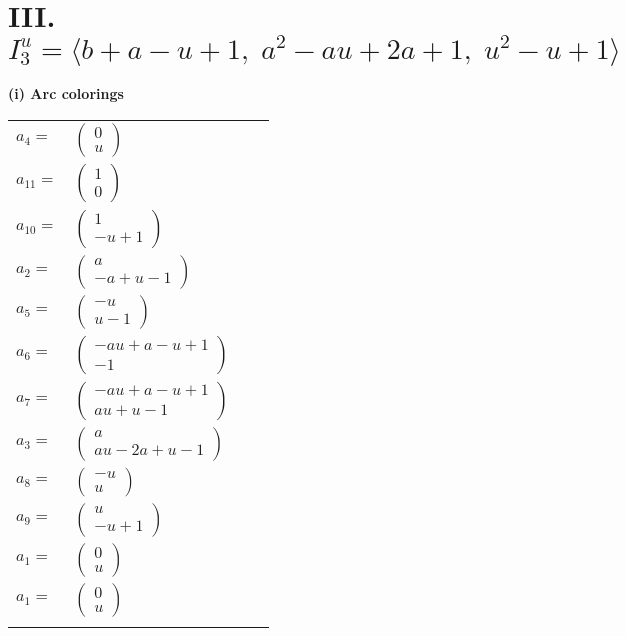 \documentclass[1p]{elsarticle_modified}
\theoremstyle{definition}
\begin{document}
\centering \section*{III. $I^u_{3}= \langle b+a- u+1,\;a^2- a u+2 a+1,\;u^2- u+1 \rangle$}
\flushleft \textbf{(i) Arc colorings}\\
\begin{tabular}{m{7pt} m{180pt} m{7pt} m{180pt} }
\flushright $a_{4}=$&$\begin{pmatrix}0\\u\end{pmatrix}$ \\
\flushright $a_{11}=$&$\begin{pmatrix}1\\0\end{pmatrix}$ \\
\flushright $a_{10}=$&$\begin{pmatrix}1\\- u+1\end{pmatrix}$ \\
\flushright $a_{2}=$&$\begin{pmatrix}a\\- a+u-1\end{pmatrix}$ \\
\flushright $a_{5}=$&$\begin{pmatrix}- u\\u-1\end{pmatrix}$ \\
\flushright $a_{6}=$&$\begin{pmatrix}- a u+a- u+1\\-1\end{pmatrix}$ \\
\flushright $a_{7}=$&$\begin{pmatrix}- a u+a- u+1\\a u+u-1\end{pmatrix}$ \\
\flushright $a_{3}=$&$\begin{pmatrix}a\\a u-2 a+u-1\end{pmatrix}$ \\
\flushright $a_{8}=$&$\begin{pmatrix}- u\\u\end{pmatrix}$ \\
\flushright $a_{9}=$&$\begin{pmatrix}u\\- u+1\end{pmatrix}$ \\
\flushright $a_{1}=$&$\begin{pmatrix}0\\u\end{pmatrix}$\\ \flushright $a_{1}=$&$\begin{pmatrix}0\\u\end{pmatrix}$\\&\end{tabular}
\end{document}
